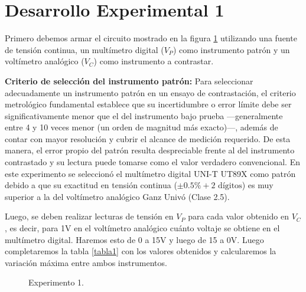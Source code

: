 \section{Desarrollo Experimental 1}
Primero debemos armar el circuito mostrado en la figura \ref{circuito1} utilizando una fuente de tensión continua, un multímetro digital ($V_P$) como instrumento patrón y un voltímetro analógico ($V_C$) como instrumento a contrastar. 

\textbf{Criterio de selección del instrumento patrón:} Para seleccionar adecuadamente un instrumento patrón en un ensayo de contrastación, el criterio metrológico fundamental establece que su incertidumbre o error límite debe ser significativamente menor que el del instrumento bajo prueba —generalmente entre 4 y 10 veces menor (un orden de magnitud más exacto)—, además de contar con mayor resolución y cubrir el alcance de medición requerido. De esta manera, el error propio del patrón resulta despreciable frente al del instrumento contrastado y su lectura puede tomarse como el valor verdadero convencional. En este experimento se seleccionó el multímetro digital UNI-T UT89X como patrón debido a que su exactitud en tensión continua ($\pm 0.5\% + 2\text{ dígitos}$) es muy superior a la del voltímetro analógico Ganz Univó (Clase 2.5).

Luego, se deben realizar lecturas de tensión en $V_P$ para cada valor obtenido en $V_C$, es decir, para 1V en el voltímetro analógico cuánto voltaje se obtiene en el multímetro digital. Haremos esto de 0 a 15V y luego de 15 a 0V. Luego completaremos la tabla \ref{tabla1} con los valores obtenidos y calcularemos la variación máxima entre ambos instrumentos.

\vspace{1cm}

\begin{figure}[H]
\centering
{}
\begingroup
\renewcommand{\figurename}{Circuito}
\caption{Experimento 1.}
\label{circuito1}
\endgroup
\end{figure}

